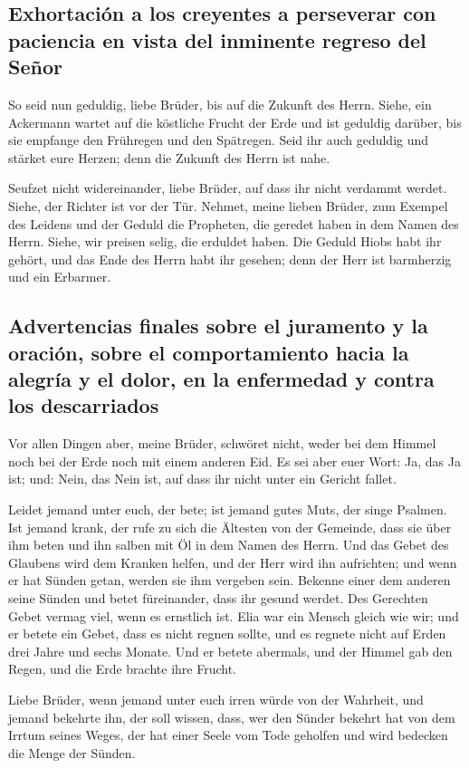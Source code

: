 \hypertarget{exhortaciuxf3n-a-los-creyentes-a-perseverar-con-paciencia-en-vista-del-inminente-regreso-del-seuxf1or}{%
\subsection{Exhortación a los creyentes a perseverar con paciencia en
vista del inminente regreso del
Señor}\label{exhortaciuxf3n-a-los-creyentes-a-perseverar-con-paciencia-en-vista-del-inminente-regreso-del-seuxf1or}}

 So seid nun geduldig, liebe Brüder, bis auf die Zukunft
des Herrn. Siehe, ein Ackermann wartet auf die köstliche Frucht der Erde
und ist geduldig darüber, bis sie empfange den Frühregen und den
Spätregen.  Seid ihr auch geduldig und stärket eure
Herzen; denn die Zukunft des Herrn ist nahe.

 Seufzet nicht widereinander, liebe Brüder, auf dass ihr
nicht verdammt werdet. Siehe, der Richter ist vor der Tür.
 Nehmet, meine lieben Brüder, zum Exempel des Leidens und
der Geduld die Propheten, die geredet haben in dem Namen des Herrn.
 Siehe, wir preisen selig, die erduldet haben. Die Geduld
Hiobs habt ihr gehört, und das Ende des Herrn habt ihr gesehen; denn der
Herr ist barmherzig und ein Erbarmer.

\hypertarget{advertencias-finales-sobre-el-juramento-y-la-oraciuxf3n-sobre-el-comportamiento-hacia-la-alegruxeda-y-el-dolor-en-la-enfermedad-y-contra-los-descarriados}{%
\subsection{Advertencias finales sobre el juramento y la oración, sobre
el comportamiento hacia la alegría y el dolor, en la enfermedad y contra
los
descarriados}\label{advertencias-finales-sobre-el-juramento-y-la-oraciuxf3n-sobre-el-comportamiento-hacia-la-alegruxeda-y-el-dolor-en-la-enfermedad-y-contra-los-descarriados}}

 Vor allen Dingen aber, meine Brüder, schwöret nicht,
weder bei dem Himmel noch bei der Erde noch mit einem anderen Eid. Es
sei aber euer Wort: Ja, das Ja ist; und: Nein, das Nein ist, auf dass
ihr nicht unter ein Gericht fallet.

 Leidet jemand unter euch, der bete; ist jemand gutes
Muts, der singe Psalmen.  Ist jemand krank, der rufe zu
sich die Ältesten von der Gemeinde, dass sie über ihm beten und ihn
salben mit Öl in dem Namen des Herrn.  Und das Gebet des
Glaubens wird dem Kranken helfen, und der Herr wird ihn aufrichten; und
wenn er hat Sünden getan, werden sie ihm vergeben sein. 
Bekenne einer dem anderen seine Sünden und betet füreinander, dass ihr
gesund werdet. Des Gerechten Gebet vermag viel, wenn es ernstlich ist.
 Elia war ein Mensch gleich wie wir; und er betete ein
Gebet, dass es nicht regnen sollte, und es regnete nicht auf Erden drei
Jahre und sechs Monate.  Und er betete abermals, und der
Himmel gab den Regen, und die Erde brachte ihre Frucht.

 Liebe Brüder, wenn jemand unter euch irren würde von der
Wahrheit, und jemand bekehrte ihn,  der soll wissen,
dass, wer den Sünder bekehrt hat von dem Irrtum seines Weges, der hat
einer Seele vom Tode geholfen und wird bedecken die Menge der Sünden.

